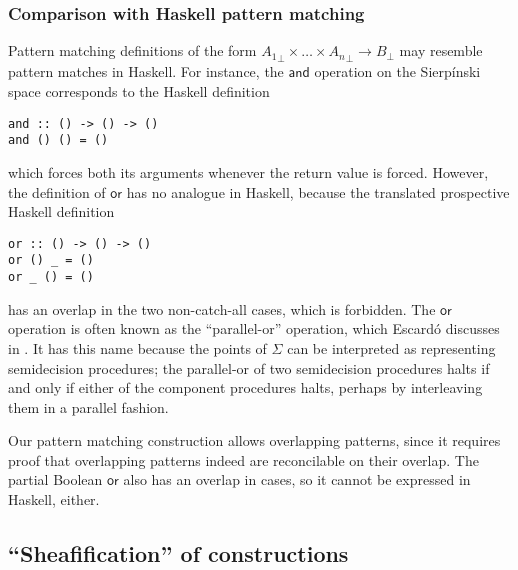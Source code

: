 \documentclass[conference]{IEEEtran}
\begin{document}
\subsubsection{Comparison with Haskell pattern matching}

Pattern matching definitions of the form ${A_1}_\bot \times \ldots \times {A_n}_\bot \to B_\bot$ may resemble pattern matches in Haskell. For instance, the $\mathsf{and}$ operation on the Sierp\'inski space corresponds to the Haskell definition
\begin{verbatim}
and :: () -> () -> ()
and () () = ()
\end{verbatim}
which forces both its arguments whenever the return value is forced. However, the definition of $\mathsf{or}$ has no analogue in Haskell, because the translated prospective Haskell definition
\begin{verbatim}
or :: () -> () -> ()
or () _ = ()
or _ () = ()
\end{verbatim}
has an overlap in the two non-catch-all cases, which is forbidden.
The $\mathsf{or}$ operation is often known as the ``parallel-or'' operation, which Escard\'o discusses in \cite{escardo2004}. It has this name because the points of $\Sigma$ can be interpreted as representing semidecision procedures; the parallel-or of two semidecision procedures halts if and only if either of the component procedures halts, perhaps by interleaving them in a parallel fashion.

Our pattern matching construction allows overlapping patterns, since it requires proof that overlapping patterns indeed are reconcilable on their overlap. The partial Boolean $\mathsf{or}$ also has an overlap  in cases, so it cannot be expressed in Haskell, either.

\subsection{``Sheafification'' of constructions}
\label{s:ex:sheaf}
\end{document}
